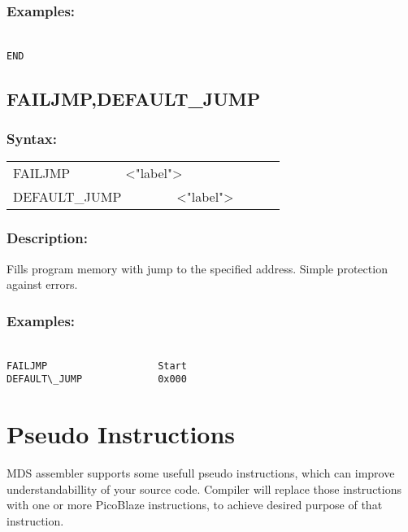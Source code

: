         \subsubsection{Examples:}
            {
                ~\\
                \usecodefont
                \verb'END'
            }

    \subsection{FAILJMP,DEFAULT\_JUMP}
        \subsubsection{Syntax:}
         {
                \texttt{}
                \begin{tabular}[h!]{llll}
                        { \color{highlight_directive} FAILJMP }\verb`       `{ \color{highlight_string} <"label"> }\\
                        { \color{highlight_directive} DEFAULT\_JUMP }\verb`       `{ \color{highlight_string} <"label"> }\\
                \end{tabular}
            }
            
        \subsubsection{Description:}
        Fills program memory with jump to the specified address. Simple protection against errors.

        \subsubsection{Examples:}
            {
                ~\\
                \usecodefont
                \verb'FAILJMP                   Start'\\
                \verb'DEFAULT\_JUMP             0x000'\\
            }


\section{Pseudo Instructions}
MDS assembler supports some usefull pseudo instructions, which can improve understandabillity of your source code. Compiler will replace those instructions with one or more PicoBlaze instructions, to achieve desired purpose of that instruction.

